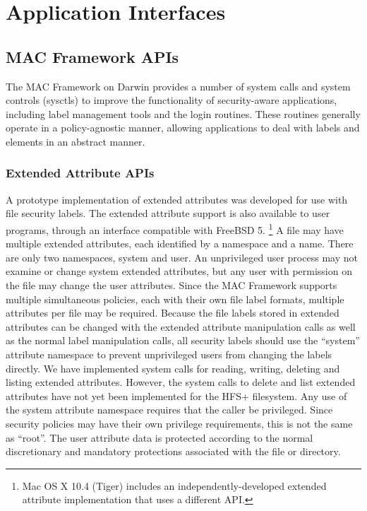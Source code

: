 \section{Application Interfaces}

\subsection{MAC Framework APIs}

The MAC Framework on Darwin provides a number of system calls and system
controls (sysctls) to improve the functionality of security-aware
applications, including label management tools and the login routines.
These routines generally operate in a policy-agnostic manner, allowing
applications to deal with labels and elements in an abstract manner.

\subsubsection{Extended Attribute APIs}

A prototype implementation of extended attributes was developed for
use with file security labels. The extended attribute support is
also available to user programs, through an interface compatible
with FreeBSD 5. \footnote{Mac OS X 10.4 (Tiger) includes an
independently-developed extended attribute implementation that uses
a different API.} A file may have multiple extended attributes,
each identified by a namespace and a name. There are only two
namespaces, system and user.  An unprivileged user process may not
examine or change system extended attributes, but any user with
permission on the file may change the user attributes.  Since the
MAC Framework supports multiple simultaneous policies, each with
their own file label formats, multiple attributes per file may be
required. Because the file labels stored in extended attributes can
be changed with the extended attribute manipulation calls as well
as the normal label manipulation calls, all security labels should
use the ``system'' attribute namespace to prevent unprivileged users
from changing the labels directly.  We have implemented system calls
for reading, writing, deleting and listing extended attributes.
However, the system calls to delete and list extended attributes
have not yet been implemented for the HFS+ filesystem.  Any use of
the system attribute namespace requires that the caller be privileged.
Since security policies may have their own privilege requirements,
this is not the same as ``root''. The user attribute data is protected
according to the normal discretionary and mandatory protections
associated with the file or directory.

